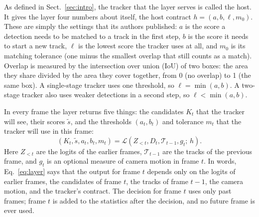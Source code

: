 As defined in Sect.~\ref{sec:intro}, the tracker that the layer serves is
called the host. It gives the layer four numbers about itself, the host
contract $h=(a,b,\ell,m_0)$. These are simply the settings that its
authors published: $a$ is the score a detection needs to be matched to a
track in the first step, $b$ is the score it needs to start a new track,
$\ell$ is the lowest score the tracker uses at all, and $m_0$ is its matching
tolerance (one minus the smallest overlap that still counts as a match).
Overlap is measured by the intersection over union (IoU) of two boxes: the
area they share divided by the area they cover together, from 0 (no overlap)
to 1 (the same box). A
single-stage tracker uses one threshold, so $\ell=\min(a,b)$. A two-stage
tracker also uses weaker detections in a second step, so
$\ell<\min(a,b)$.

In every frame the layer returns five things: the candidates $K_t$ that the
tracker will see, their scores $\tilde{s}$, and the thresholds $(a_t,b_t)$
and tolerance $m_t$ that the tracker will use in this frame:
\begin{equation}
\left(K_t,\tilde{s},a_t,b_t,m_t\right)=
\mathcal{L}\left(Z_{<t},D_t,\mathcal{T}_{t-1},g_t;\,h\right).
\label{eq:layer}
\end{equation}
Here $Z_{<t}$ are the logits of the earlier frames, $\mathcal{T}_{t-1}$ are
the tracks of the previous frame, and $g_t$ is an optional measure of camera
motion in frame $t$. In words, Eq.~\eqref{eq:layer} says that the output for
frame $t$ depends only on the logits of earlier frames, the candidates of
frame $t$, the tracks of frame $t-1$, the camera motion, and the tracker's
contract. The decision for frame $t$ uses only past frames; frame $t$ is
added to the statistics after the decision, and no future frame is ever
used.


